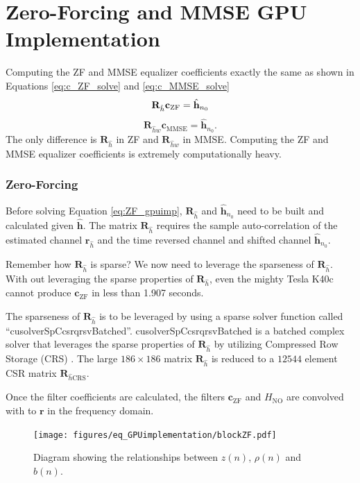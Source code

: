 \section{Zero-Forcing and MMSE GPU Implementation}
Computing the ZF and MMSE equalizer coefficients exactly the same as shown in Equations \ref{eq:c_ZF_solve} and \ref{eq:c_MMSE_solve}
\begin{equation}
\mathbf{R}_{\hat{h}} \mathbf{c}_\text{ZF} = \hat{\mathbf{h}}_{n_0}\\
\label{eq:ZF_gpuimp}
\end{equation}
\begin{equation}
\mathbf{R}_{\hat{h}w} \mathbf{c}_\text{MMSE} = \hat{\mathbf{h}}_{n_0}.
\label{eq:MMSE_gpuimp}
\end{equation}
The only difference is $\mathbf{R}_{\hat{h}}$ in ZF and $\mathbf{R}_{\hat{h}w}$ in MMSE.
Computing the ZF and MMSE equalizer coefficients is extremely computationally heavy.

\subsubsection{Zero-Forcing}
Before solving Equation \ref{eq:ZF_gpuimp}, $\mathbf{R}_{\hat{h}}$ and $\hat{\mathbf{h}}_{n_0}$ need to be built and calculated given $\hat{\mathbf{h}}$.
The matrix $\mathbf{R}_{\hat{h}}$ requires the sample auto-correlation of the estimated channel $\mathbf{r}_{\hat{h}}$ and the time reversed channel and shifted channel $\hat{\mathbf{h}}_{n_0}$.

Remember how $\mathbf{R}_{\hat{h}}$ is sparse? 
We now need to leverage the sparseness of $\mathbf{R}_{\hat{h}}$. 
With out leveraging the sparse properties of $\mathbf{R}_{\hat{h}}$, even the mighty Tesla K40c cannot produce $\mathbf{c}_\text{ZF}$ in less than 1.907 seconds.

The sparseness of $\mathbf{R}_{\hat{h}}$ is to be leveraged by using a sparse solver function called ``cusolverSpCcsrqrsvBatched''.
cusolverSpCcsrqrsvBatched is a batched complex solver that leverages the sparse properties of $\mathbf{R}_{\hat{h}}$ by utilizing Compressed Row Storage (CRS) \cite{wiki:Sparse_matrix}.
The large $186\times186$ matrix $\mathbf{R}_{\hat{h}}$ is reduced to a $12544$ element CSR matrix $\mathbf{R}_{\hat{h}\text{CRS}}$.

Once the filter coefficients are calculated, the filters $\mathbf{c}_{\text{ZF}}$ and $H_\text{NO}$ are convolved with to $\mathbf{r}$ in the frequency domain.
\begin{figure}
	\caption{Diagram showing the relationships between $z(n)$, $\rho(n)$ and $b(n)$.}
	\centering\texttt{[image: figures/eq\_GPUimplementation/blockZF.pdf]}
	\label{fig:blockZF}
\end{figure}

